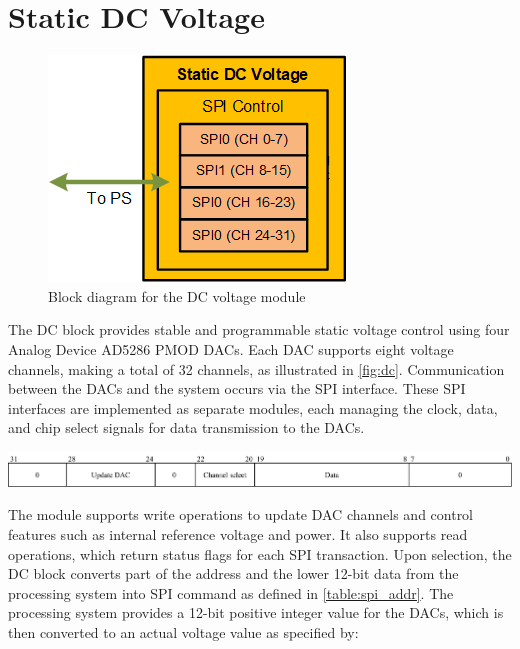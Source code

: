 \section{Static DC Voltage}
\begin{figure}[h]
    \centering
    \includegraphics[width=0.5\linewidth]{figures/5.2.png}
    \caption{Block diagram for the DC voltage module}
    \label{fig:dc}
\end{figure}
The DC block provides stable and programmable static voltage control using four Analog Device AD5286 PMOD DACs. Each DAC supports eight voltage channels, making a total of 32 channels, as illustrated in \autoref{fig:dc}. Communication between the DACs and the system occurs via the SPI interface. These SPI interfaces are implemented as separate modules, each managing the clock, data, and chip select signals for data transmission to the DACs.

\begin{table}[h]
\centering

\caption{SPI DAC message format [XX]}
\includegraphics[width=1.0\textwidth]{figures/spi_addr.png}
\label{table:spi_addr}
\end{table}

The module supports write operations to update DAC channels and control features such as internal reference voltage and power. It also supports read operations, which return status flags for each SPI transaction. Upon selection, the DC block converts part of the address and the lower 12-bit data from the processing system into SPI command as defined in \autoref{table:spi_addr}. The processing system provides a 12-bit positive integer value for the DACs, which is then converted to an actual voltage value as specified by:

